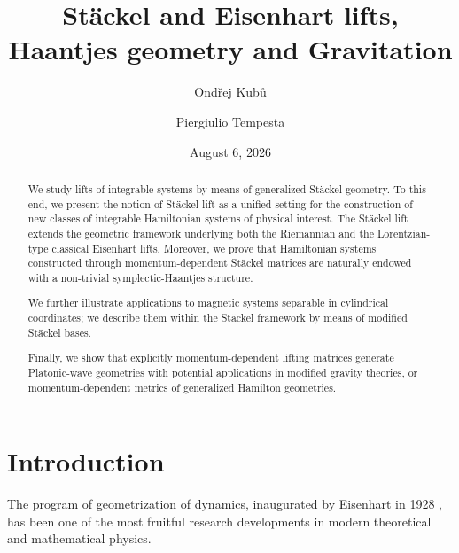 \documentclass[10pt]{amsart}
\numberwithin{equation}{section}
\theoremstyle{definition}
\begin{document}
	
	\title[St\"ackel and Eisenhart lifts, Haantjes geometry and Gravitation]{St\"ackel and Eisenhart lifts, Haantjes geometry and Gravitation}
	
	\author{Ond\v{r}ej Kub\r{u}}
	\address{Instituto de Ciencias Matem\'aticas, C/ Nicol\'as Cabrera, No 13--15, 28049 Madrid, Spain}
	\author{Piergiulio Tempesta}
	\address{Departamento de F\'{\i}sica Te\'{o}rica, Facultad de Ciencias F\'{\i}sicas, Universidad
		Complutense de Madrid, 28040 -- Madrid, Spain \\ and Instituto de Ciencias Matem\'aticas, C/ Nicol\'as Cabrera, No 13--15, 28049 Madrid, Spain}
	
	
	
	
	
	\date{August 6, 2026}
	
	\begin{abstract}
	We study lifts of integrable systems by means of generalized Stäckel geometry. To this end, we present the notion of Stäckel lift as a unified setting for the construction of new classes of integrable Hamiltonian systems of physical interest. The Stäckel lift extends the geometric framework underlying both the  Riemannian and the Lorentzian-type classical Eisenhart lifts.
		Moreover, we prove that Hamiltonian systems constructed through momentum-dependent Stäckel matrices are naturally endowed with a non-trivial symplectic-Haantjes structure.
		
		We further illustrate applications to magnetic systems separable in cylindrical coordinates; we describe them within  the Stäckel framework by means of modified Stäckel bases.

		
		Finally, we show that explicitly momentum-dependent lifting matrices generate Platonic-wave geometries with potential applications in modified gravity theories, or momentum-dependent metrics of generalized Hamilton geometries.
		
		
	\end{abstract}
	
	\maketitle
	
	
	\tableofcontents
	
	\section{Introduction}
	The program of geometrization of dynamics, inaugurated by Eisenhart in 1928 \cite{E1928AM}, has been one of the most fruitful research developments in modern theoretical and mathematical physics. 
	
\end{document}
